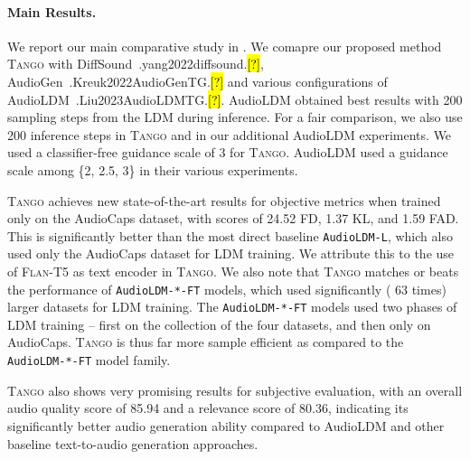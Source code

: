 \documentclass{article}
\newcommand{\model}{\textsc{Tango}}
\let\realcite\cite
\renewcommand{\cite}[1]{\ifx.#1.\hl{[?]}\else\realcite{#1}\fi}
\begin{document}
\paragraph{Main Results.}
We report our main comparative study in . We comapre our proposed method \model{} with DiffSound~\cite{yang2022diffsound}, AudioGen~\cite{Kreuk2022AudioGenTG} and various configurations of AudioLDM~\cite{Liu2023AudioLDMTG}. AudioLDM obtained best results with 200 sampling steps from the LDM during inference. For a fair comparison, we also use 200 inference steps in \model{} and in our additional AudioLDM experiments. We used a classifier-free guidance scale of 3 for \model{}. AudioLDM used a guidance scale among \{2, 2.5, 3\} in their various experiments.

\model{} achieves new state-of-the-art results for objective metrics when trained only on the AudioCaps dataset, with scores of 24.52 FD, 1.37 KL, and 1.59 FAD. This is significantly better than the most direct baseline \texttt{AudioLDM-L}, which also used only the AudioCaps dataset for LDM training. We attribute this to the use of \textsc{Flan-T5} as text encoder in \model{}. We also note that \model{} matches or beats the performance of \texttt{AudioLDM-*-FT} models, which used significantly ( 63 times) larger datasets for LDM training. The \texttt{AudioLDM-*-FT} models used two phases of LDM training -- first on the collection of the four datasets, and then only on AudioCaps. \model{} is thus far more sample efficient as compared to the \texttt{AudioLDM-*-FT} model family.

\model{} also shows very promising results for subjective evaluation, with an overall audio quality score of 85.94 and a relevance score of 80.36, indicating its significantly better audio generation ability compared to AudioLDM and other baseline text-to-audio generation approaches. 
\end{document}
